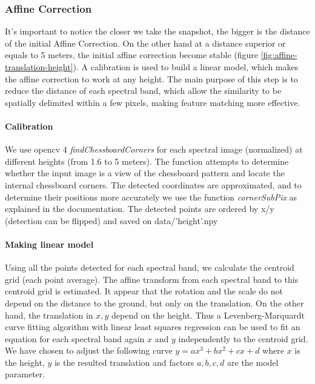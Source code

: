 \documentclass[]{elsarticle}
\begin{document}
	\subsubsection{Affine Correction}
	
	It's important to notice the closer we take the snapshot, the bigger is the distance of the initial Affine Correction.
	On the other hand at a distance superior or equals to 5 meters, the initial affine correction become stable (figure \ref{fig:affine-translation-height}).
	A calibration is used to build a linear model, which makes the affine correction to work at any height.
	The main purpose of this step is to reduce the distance of each spectral band,
	which allow the similarity to be spatially delimited within a few pixels, making feature matching more effective.
	
	\paragraph{Calibration}
	We use opencv 4 \textit{findChessboardCorners} for each spectral image (normalized) at different heights (from 1.6 to 5 meters).
	The function attempts to determine whether the input image is a view of the chessboard pattern and locate the internal chessboard corners.
	The detected coordinates are approximated, and to determine their positions more accurately we use the function \textit{cornerSubPix} as explained in the documentation.
	The detected points are ordered by x/y (detection can be flipped) and saved on data/'height'.npy
	
	\paragraph{Making linear model}
	
	Using all the points detected for each spectral band, we calculate the centroid grid (each point average).
	The affine transform from each spectral band to this centroid grid is estimated.
	It appear that the rotation and the scale do not depend on the distance to the ground, but only on the translation.
	On the other hand, the translation in $x, y$ depend on the height.
	Thus a Levenberg-Marquardt curve fitting algorithm with linear least squares regression \cite{More78}
	can be used to fit an equation for each spectral band again $x$ and $y$ independently to the centroid grid.
	We have chosen to adjust the following curve $y = ax^3 + bx^2 + cx + d$ where $x$ is the height,
	$y$ is the resulted translation and factors $a,b,c,d$ are the model parameter.
	
\end{document}
